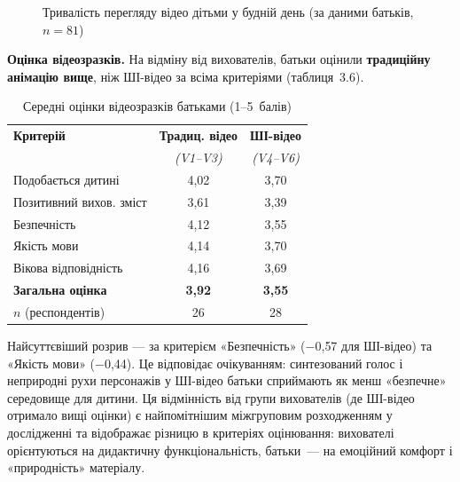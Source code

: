 \documentclass[14pt, a4paper]{extreport}
\begin{document}
\begin{figure}[htbp]
\centering
{}
\caption{Тривалість перегляду відео дітьми у будній день (за даними батьків, $n=81$)}
\end{figure}

\textbf{Оцінка відеозразків.} На відміну від вихователів, батьки оцінили \textbf{традиційну анімацію вище}, ніж ШІ-відео за всіма критеріями (таблиця~3.6).

\begin{table}[htbp]
\caption{Середні оцінки відеозразків батьками (1--5~балів)}
\centering
\begin{tabular}{|l|c|c|}
\hline
\rowcolor{tblhead}\textbf{Критерій} & \textbf{Традиц. відео} & \textbf{ШІ-відео} \\
\rowcolor{tblhead} & \textit{(V1--V3)} & \textit{(V4--V6)} \\
\hline
Подобається дитині          & 4{,}02 & 3{,}70 \\
Позитивний вихов. зміст     & 3{,}61 & 3{,}39 \\
Безпечність                 & 4{,}12 & 3{,}55 \\
Якість мови                 & 4{,}14 & 3{,}70 \\
Вікова відповідність        & 4{,}16 & 3{,}69 \\
\textbf{Загальна оцінка}    & \textbf{3{,}92} & \textbf{3{,}55} \\
\hline
$n$ (респондентів) & 26 & 28 \\
\hline
\end{tabular}
\end{table}

Найсуттєвіший розрив --- за критерієм «Безпечність» ($-$0{,}57 для ШІ-відео) та «Якість мови» ($-$0{,}44). Це відповідає очікуванням: синтезований голос і неприродні рухи персонажів у ШІ-відео батьки сприймають як менш «безпечне» середовище для дитини. Ця відмінність від групи вихователів (де ШІ-відео отримало вищі оцінки) є найпомітнішим міжгруповим розходженням у дослідженні та відображає різницю в критеріях оцінювання: вихователі орієнтуються на дидактичну функціональність, батьки~--- на емоційний комфорт і «природність» матеріалу.
\end{document}
